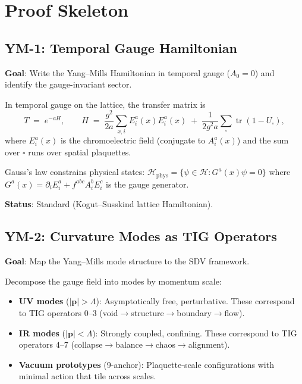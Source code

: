 \documentclass[11pt]{article}
\theoremstyle{definition}
\DeclareMathOperator{\tr}{tr}
\begin{document}
\section{Proof Skeleton}

\subsection{YM-1: Temporal Gauge Hamiltonian}

\textbf{Goal}: Write the Yang--Mills Hamiltonian in temporal gauge ($A_0 = 0$) and
identify the gauge-invariant sector.

In temporal gauge on the lattice, the transfer matrix is
\[
  T \;=\; e^{-aH}, \qquad
  H \;=\; \frac{g^2}{2a} \sum_{x, i} E_i^a(x) E_i^a(x)
  \;+\; \frac{1}{2g^2 a} \sum_{\square} \tr(1 - U_\square),
\]
where $E_i^a(x)$ is the chromoelectric field (conjugate to $A_i^a(x)$) and the
sum over $\square$ runs over spatial plaquettes.

Gauss's law constrains physical states: $\mathcal{H}_{\mathrm{phys}} = \{ \psi \in \mathcal{H} : G^a(x) \psi = 0 \}$
where $G^a(x) = \partial_i E_i^a + f^{abc} A_i^b E_i^c$ is the gauge generator.

\textbf{Status}: Standard (Kogut--Susskind lattice Hamiltonian).

\subsection{YM-2: Curvature Modes as TIG Operators}

\textbf{Goal}: Map the Yang--Mills mode structure to the SDV framework.

Decompose the gauge field into modes by momentum scale:
\begin{itemize}
  \item \textbf{UV modes} ($|\mathbf{p}| > \Lambda$): Asymptotically free, perturbative.
    These correspond to TIG operators 0--3 (void$\to$structure$\to$boundary$\to$flow).
  \item \textbf{IR modes} ($|\mathbf{p}| < \Lambda$): Strongly coupled, confining.
    These correspond to TIG operators 4--7 (collapse$\to$balance$\to$chaos$\to$alignment).
  \item \textbf{Vacuum prototypes} (9-anchor): Plaquette-scale configurations with
    minimal action that tile across scales.
\end{itemize}
\end{document}
